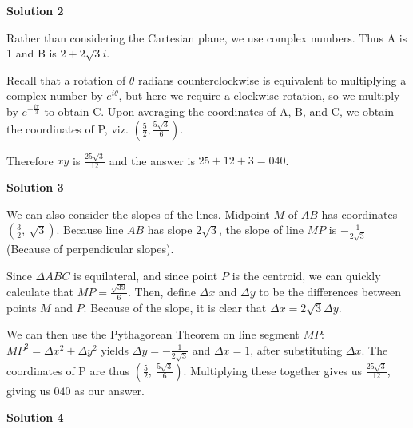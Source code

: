 \begin{enumerate}
\textbf{Solution 2}

Rather than considering the Cartesian plane, we use complex numbers. Thus A is 1 and B is $2 + 2\sqrt{3}i$. 

 Recall that a rotation of $\theta$ radians counterclockwise is equivalent to multiplying a complex number by $e^{i\theta}$, but here we require a clockwise rotation, so we multiply by $e^{-\frac{i\pi}{3}}$ to obtain C. Upon averaging the coordinates of A, B, and C, we obtain the coordinates of P, viz. $\left(\frac{5}{2}, \frac{5\sqrt{3}}{6}\right)$.

 Therefore $xy$ is $\frac{25\sqrt{3}}{12}$ and the answer is $25 + 12 + 3 = \boxed{040}$.

 



\textbf{Solution 3}

We can also consider the slopes of the lines. Midpoint $M$ of $AB$ has coordinates $\left(\frac{3}{2},\ \sqrt{3}\right)$. Because line $AB$ has slope $2\sqrt{3}$, the slope of line $MP$ is  $-\frac{1}{2\sqrt{3}}$ (Because of perpendicular slopes). 

 Since $\Delta ABC$ is equilateral, and since point $P$ is the centroid, we can quickly calculate that $MP = \frac{\sqrt{39}}{6}$. Then, define $\Delta x$ and $\Delta y$ to be the differences between points $M$ and $P$. Because of the slope, it is clear that $\Delta x = 2\sqrt{3} \Delta y$.

 We can then use the Pythagorean Theorem on line segment $MP$: $MP^2 = \Delta x^2 + \Delta y^2$ yields $\Delta y = -\frac{1}{2\sqrt{3}}$ and $\Delta x = 1$, after substituting $\Delta x$. The coordinates of P are thus $\left(\frac{5}{2},\ \frac{5\sqrt{3}}{6}\right)$. Multiplying these together gives us $\frac{25\sqrt{3}}{12}$, giving us $\boxed{040}$ as our answer.

 



\textbf{Solution 4}


\end{enumerate}

